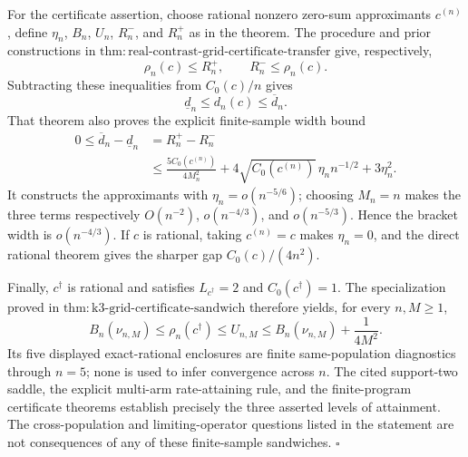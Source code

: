 For the certificate assertion, choose rational nonzero zero-sum approximants \(c^{(n)}\), define \(\eta_n\), \(B_n\), \(U_n\), \(R_n^-\), and \(R_n^+\) as in the theorem.  The procedure and prior constructions in \(\mathrm{thm:real\text{-}contrast\text{-}grid\text{-}certificate\text{-}transfer}\) give, respectively,
\[
 \rho_n(c)\leq R_n^+,
 \qquad
 R_n^-\leq\rho_n(c).
\]
Subtracting these inequalities from \(C_0(c)/n\) gives
\[
 \underline d_n\leq d_n(c)\leq\overline d_n.
\]
That theorem also proves the explicit finite-sample width bound
\[
 \begin{aligned}
 0\leq\overline d_n-\underline d_n
 &=R_n^+-R_n^-\\
 &\leq\frac{5C_0(c^{(n)})}{4M_n^2}
 +4\sqrt{C_0(c^{(n)})}\,\eta_n n^{-1/2}
 +3\eta_n^2.
 \end{aligned}
\]
It constructs the approximants with \(\eta_n=o(n^{-5/6})\); choosing \(M_n=n\) makes the three terms respectively \(O(n^{-2})\), \(o(n^{-4/3})\), and \(o(n^{-5/3})\).  Hence the bracket width is \(o(n^{-4/3})\).  If \(c\) is rational, taking \(c^{(n)}=c\) makes \(\eta_n=0\), and the direct rational theorem gives the sharper gap \(C_0(c)/(4n^2)\).

Finally, \(c^\dagger\) is rational and satisfies \(L_{c^\dagger}=2\) and \(C_0(c^\dagger)=1\).  The specialization proved in \(\mathrm{thm:k3\text{-}grid\text{-}certificate\text{-}sandwich}\) therefore yields, for every \(n,M\geq1\),
\[
 B_n(\nu_{n,M})\leq\rho_n(c^\dagger)\leq U_{n,M}
 \leq B_n(\nu_{n,M})+\frac1{4M^2}.
\]
Its five displayed exact-rational enclosures are finite same-population diagnostics through \(n=5\); none is used to infer convergence across \(n\).  The cited support-two saddle, the explicit multi-arm rate-attaining rule, and the finite-program certificate theorems establish precisely the three asserted levels of attainment.  The cross-population and limiting-operator questions listed in the statement are not consequences of any of these finite-sample sandwiches. \(\square\)